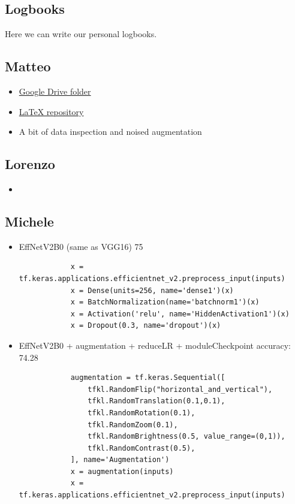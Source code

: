 \documentclass[11pt]{article}
\begin{document}
\begin{multicols*}{2}
        \newpage

        \section{Logbooks}

        Here we can write our personal logbooks.

        \subsection{Matteo}

        \begin{itemize}
            \item \href{https://drive.google.com/drive/folders/1XqCxOkXIFV81NU8IlltS38bM65k9N-bR?usp=sharing}{Google Drive folder}
            \item \href{https://github.com/BonfaTex/DeepL-1}{\LaTeX{} repository}
            \item A bit of data inspection and noised augmentation
        \end{itemize}

        \subsection{Lorenzo}

        \begin{itemize}
            \item 
        \end{itemize}

        \subsection{Michele}

        \begin{itemize}
            \item EffNetV2B0 (same as VGG16)
            75%
            \begin{lstlisting}
            x = tf.keras.applications.efficientnet_v2.preprocess_input(inputs)
            x = Dense(units=256, name='dense1')(x)
            x = BatchNormalization(name='batchnorm1')(x)
            x = Activation('relu', name='HiddenActivation1')(x)
            x = Dropout(0.3, name='dropout')(x)
            \end{lstlisting}
            \item EffNetV2B0 + augmentation + reduceLR + moduleCheckpoint
            accuracy: 74.28%
            \begin{lstlisting}
            augmentation = tf.keras.Sequential([
                tfkl.RandomFlip("horizontal_and_vertical"),
                tfkl.RandomTranslation(0.1,0.1),
                tfkl.RandomRotation(0.1),
                tfkl.RandomZoom(0.1),
                tfkl.RandomBrightness(0.5, value_range=(0,1)),
                tfkl.RandomContrast(0.5),
            ], name='Augmentation')
            x = augmentation(inputs)
            x = tf.keras.applications.efficientnet_v2.preprocess_input(inputs)


\end{lstlisting}
\end{itemize}
\end{multicols*}
\end{document}
